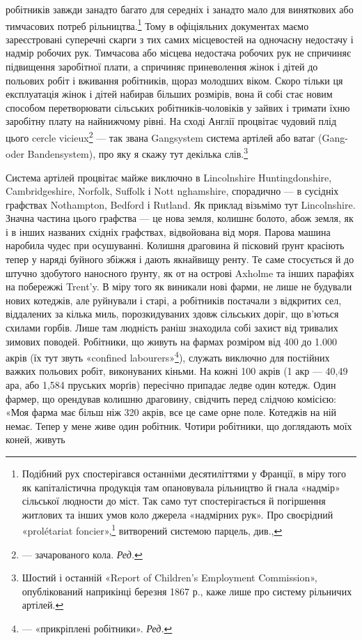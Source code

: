 робітників завжди занадто багато для середніх і занадто мало для
виняткових або тимчасових потреб рільництва.\footnote{
Подібний рух спостерігався останніми десятиліттями у Франції,
в міру того як капіталістична продукція там опановувала рільництво й
гнала «надмір» сільської людности до міст. Так само тут спостерігається
й погіршення житлових та інших умов коло джерела «надмірних рук».
Про своєрідний «prolétariat foncier»,\footnote*{
— сільський пролетаріят. \emph{Ред.}
} витворений системою парцель, див.,
} Тому в офіціяльних
документах маємо зареєстровані суперечні скарги з
тих самих місцевостей на одночасну недостачу і надмір робочих
рук. Тимчасова або місцева недостача робочих рук не спричиняє
підвищення заробітної плати, а спричиняє приневолення жінок
і дітей до польових робіт і вживання робітників, щораз молодших
віком. Скоро тільки ця експлуатація жінок і дітей набирав
більших розмірів, вона й собі стає новим способом перетворювати
сільських робітників-чоловіків у зайвих і тримати їхню
заробітну плату на найнижчому рівні. На сході Англії процвітає
чудовий плід цього cercle vicieux\footnote*{
— зачарованого кола. \emph{Ред.}
} — так звана Gangsystem
система артілей або ватаг (Gang-oder Bandensystem), про яку
я скажу тут декілька слів.\footnote{
Шостий і останній «Report of Children’s Employment Commission»,
опублікований наприкінці березня 1867 р., каже лише про систему
рільничих артілей.
}

Система артілей процвітає майже виключно в Lincolnshire
Huntingdonshire, Cambridgeshire, Norfolk, Suffolk і Nott nghamshire,
спорадично — в сусідніх графствах Nothampton, Bedford
і Rutland. Як приклад візьмімо тут Lincolnshire. Значна
частина цього графства — це нова земля, колишнє болото, абож
земля, як і в інших названих східніх графствах, відвойована від
моря. Парова машина наробила чудес при осушуванні. Колишня
драговина й пісковий ґрунт красіють тепер у наряді буйного
збіжжя і дають якнайвищу ренту. Те саме стосується й до штучно
здобутого наносного ґрунту, як от на острові Axholme та інших
парафіях на побережжі Trent’y. В міру того як виникали нові
фарми, не лише не будували нових котеджів, але руйнували і
старі, а робітників постачали з відкритих сел, віддалених за
кілька миль, порозкидуваних здовж сільських доріг, що в’ються
схилами горбів. Лише там людність раніш знаходила собі захист
від тривалих зимових поводей. Робітники, що живуть на фармах
розміром від 400 до 1.000 акрів (їх тут звуть «confined labourers»\footnote*{
— «прикріплені робітники». \emph{Ред.}
}),
служать виключно для постійних важких польових робіт, виконуваних
кіньми. На кожні 100 акрів (1 акр — 40,49 ара, або
1,584 пруських морґів) пересічно припадає ледве один котедж.
Один фармер, що орендував колишню драговину, свідчить перед
слідчою комісією: «Моя фарма має більш ніж 320 акрів, все це
саме орне поле. Котеджів на ній немає. Тепер у мене живе один
робітник. Чотири робітники, що доглядають моїх коней, живуть

